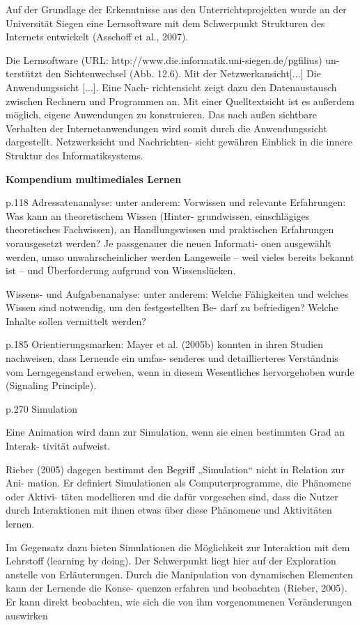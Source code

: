 Auf  der  Grundlage  der  Erkenntnisse  aus  den  Unterrichtsprojekten  wurde  an 
der Universität Siegen eine Lernsoftware mit dem Schwerpunkt Strukturen des 
Internets entwickelt (Asschoff et al., 2007).  

Die Lernsoftware (URL: http://www.die.informatik.uni-siegen.de/pgfilius) un-
terstützt den Sichtenwechsel (Abb. 12.6). Mit der Netzwerkansicht[...] 
Die Anwendungssicht [...]. Eine Nach-
richtensicht zeigt dazu den Datenaustausch zwischen Rechnern und Programmen 
an.  Mit  einer  Quelltextsicht  ist  es  außerdem  möglich,  eigene  Anwendungen  zu 
konstruieren. Das nach außen sichtbare Verhalten der Internetanwendungen wird 
somit durch die Anwendungssicht dargestellt. Netzwerksicht und Nachrichten-
sicht gewähren Einblick in die innere Struktur des Informatiksystems. 

\textbf{Kompendium multimediales Lernen}

p.118
Adressatenanalyse: unter anderem: 
Vorwissen und relevante Erfahrungen: Was kann an theoretischem Wissen (Hinter-
grundwissen,  einschlägiges  theoretisches  Fachwissen),  an  Handlungswissen  und 
praktischen Erfahrungen vorausgesetzt werden? Je passgenauer die neuen Informati-
onen ausgewählt werden, umso unwahrscheinlicher werden Langeweile – weil vieles 
bereits bekannt ist – und Überforderung aufgrund von Wissenslücken. 

Wissens- und Aufgabenanalyse: unter anderem: 
Welche Fähigkeiten und welches Wissen sind notwendig, um den festgestellten Be-
darf zu befriedigen? Welche Inhalte sollen vermittelt werden? 

p.185
Orientierungsmarken: 
Mayer et al. (2005b) konnten in ihren Studien nachweisen, dass Lernende ein umfas-
senderes und detaillierteres Verständnis vom Lerngegenstand erweben, wenn in diesem 
Wesentliches hervorgehoben wurde (Signaling Principle).

p.270
Simulation

Eine Animation wird dann zur Simulation, wenn sie einen bestimmten Grad an Interak-
tivität aufweist. 

Rieber (2005) dagegen bestimmt den Begriff „Simulation“ nicht in Relation zur Ani-
mation. Er definiert Simulationen als Computerprogramme, die Phänomene oder Aktivi-
täten modellieren und die dafür vorgesehen sind, dass die Nutzer durch Interaktionen 
mit ihnen etwas über diese Phänomene und Aktivitäten lernen.

Im Gegensatz dazu 
bieten  Simulationen  die  Möglichkeit  zur  Interaktion  mit  dem  Lehrstoff  (learning  by 
doing). Der Schwerpunkt liegt hier auf der Exploration anstelle von Erläuterungen. 
Durch die Manipulation von dynamischen Elementen kann der Lernende die Konse-
quenzen erfahren und beobachten (Rieber, 2005). Er kann direkt beobachten, wie sich 
die von ihm vorgenommenen Veränderungen auswirken 

